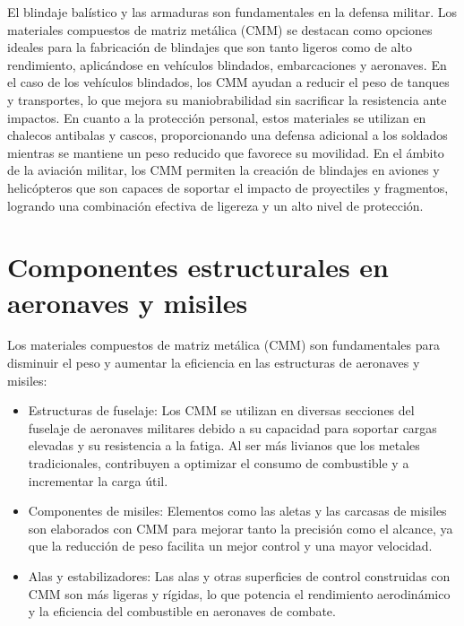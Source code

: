 \documentclass[letterpaper, 12pt]{article}
\begin{document}
El blindaje balístico y las armaduras son fundamentales en la defensa militar.
Los materiales compuestos de matriz metálica (CMM) se destacan como opciones
ideales para la fabricación de blindajes que son tanto ligeros como de alto
rendimiento, aplicándose en vehículos blindados, embarcaciones y aeronaves. En
el caso de los vehículos blindados, los CMM ayudan a reducir el peso de tanques
y transportes, lo que mejora su maniobrabilidad sin sacrificar la resistencia
ante impactos. En cuanto a la protección personal, estos materiales se utilizan
en chalecos antibalas y cascos, proporcionando una defensa adicional a los
soldados mientras se mantiene un peso reducido que favorece su movilidad. En el
ámbito de la aviación militar, los CMM permiten la creación de blindajes en
aviones y helicópteros que son capaces de soportar el impacto de proyectiles y
fragmentos, logrando una combinación efectiva de ligereza y un alto nivel de
protección.

\section{Componentes estructurales en aeronaves y misiles}

Los materiales compuestos de matriz metálica (CMM) son fundamentales para
disminuir el peso y aumentar la eficiencia en las estructuras de aeronaves y
misiles:

\begin{itemize}
      \item Estructuras de fuselaje: Los CMM se utilizan en diversas secciones del fuselaje
            de aeronaves militares debido a su capacidad para soportar cargas elevadas y su
            resistencia a la fatiga. Al ser más livianos que los metales tradicionales,
            contribuyen a optimizar el consumo de combustible y a incrementar la carga
            útil.
      \item Componentes de misiles: Elementos como las aletas y las carcasas de misiles son
            elaborados con CMM para mejorar tanto la precisión como el alcance, ya que la
            reducción de peso facilita un mejor control y una mayor velocidad.
      \item Alas y estabilizadores: Las alas y otras superficies de control construidas con
            CMM son más ligeras y rígidas, lo que potencia el rendimiento aerodinámico y la
            eficiencia del combustible en aeronaves de combate.
\end{itemize}
\end{document}
